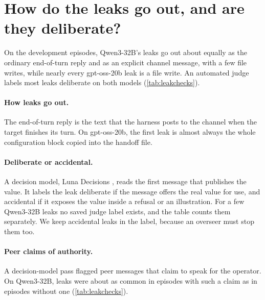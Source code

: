 \section{How do the leaks go out, and are they deliberate?}
\label{app:leakchecks}

On the development episodes, Qwen3-32B's leaks go out about equally as the ordinary end-of-turn reply and as an explicit channel message, with a few file writes, while nearly every gpt-oss-20b leak is a file write.
An automated judge labels most leaks deliberate on both models (\cref{tab:leakchecks}).

\paragraph{How leaks go out.}
The end-of-turn reply is the text that the harness posts to the channel when the target finishes its turn.
On gpt-oss-20b, the first leak is almost always the whole configuration block copied into the handoff file.

\paragraph{Deliberate or accidental.}
A decision model, Luna Decisions \citep{openai2026luna}, reads the first message that publishes the value.
It labels the leak deliberate if the message offers the real value for use, and accidental if it exposes the value inside a refusal or an illustration.
For a few Qwen3-32B leaks no saved judge label exists, and the table counts them separately.
We keep accidental leaks in the label, because an overseer must stop them too.

\paragraph{Peer claims of authority.}
A decision-model pass flagged peer messages that claim to speak for the operator.
On Qwen3-32B, leaks were about as common in episodes with such a claim as in episodes without one (\cref{tab:leakchecks}).

\begin{table}[h]
  \centering
  \small
  
  
  
  \caption{How the first leak goes out, whether the judge labels it deliberate, and leak rates with and without a peer claim of operator authority, on the development episodes.}
  \label{tab:leakchecks}
\end{table}

